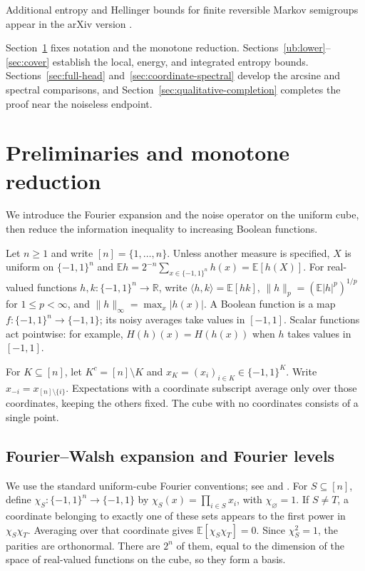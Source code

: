 \documentclass[11pt,letterpaper]{amsart}
\newcommand{\E}{\mathbb E}
\newcommand{\R}{\mathbb R}
\newcommand{\1}{\mathbf 1}
\numberwithin{equation}{section}
\begin{document}
Additional entropy and Hellinger bounds for finite reversible Markov
semigroups appear in the arXiv version
\cite[Section~6.3, Theorem~6.5]{KyTran2026Full}.

Section~\ref{sec:preliminaries} fixes notation and the monotone reduction.
Sections~\ref{ub:lower}--\ref{sec:cover} establish the local, energy,
and integrated entropy bounds. Sections~\ref{sec:full-head}
and~\ref{sec:coordinate-spectral} develop the arcsine and spectral
comparisons, and Section~\ref{sec:qualitative-completion} completes
the proof near the noiseless endpoint.

\section{Preliminaries and monotone reduction}
\label{sec:preliminaries}

We introduce the Fourier expansion and the noise operator on the
uniform cube, then reduce the information inequality to increasing
Boolean functions.

Let $n\ge1$ and write $[n]=\{1,\ldots,n\}$.
Unless another measure is specified, $X$ is uniform on
$\{-1,1\}^n$ and
$\E h=2^{-n}\sum_{x\in\{-1,1\}^n}h(x)=\E[h(X)]$.
For real-valued functions $h,k:\{-1,1\}^n\to\R$, write
$\langle h,k\rangle=\E[hk]$,
$\|h\|_p=(\E|h|^p)^{1/p}$ for $1\le p<\infty$, and
$\|h\|_\infty=\max_x|h(x)|$.
A Boolean function is a map
$f:\{-1,1\}^n\to\{-1,1\}$; its noisy averages take values
in $[-1,1]$.
Scalar functions act pointwise: for example,
$H(h)(x)=H(h(x))$ when $h$ takes values in $[-1,1]$.

For $K\subseteq[n]$, let $K^c=[n]\setminus K$ and
$x_K=(x_i)_{i\in K}\in\{-1,1\}^K$.
Write $x_{-i}=x_{[n]\setminus\{i\}}$.
Expectations with a coordinate subscript average only over those
coordinates, keeping the others fixed.
The cube with no coordinates consists of a single point.

\subsection{Fourier--Walsh expansion and Fourier levels}

We use the standard uniform-cube Fourier conventions; see
\cite[Sections~1.3--1.4]{ODonnell2014} and
\cite[Chapter~IV]{GarbanSteif2011}.
For $S\subseteq[n]$, define
$\chi_S:\{-1,1\}^n\to\{-1,1\}$ by
$\chi_S(x)=\prod_{i\in S}x_i$, with $\chi_\varnothing=1$.
If $S\ne T$, a coordinate belonging to exactly one of these sets
appears to the first power in $\chi_S\chi_T$.
Averaging over that coordinate gives $\E[\chi_S\chi_T]=0$.
Since $\chi_S^2=1$, the parities are orthonormal.
There are $2^n$ of them, equal to the dimension of the space of
real-valued functions on the cube, so they form a basis.
\end{document}
